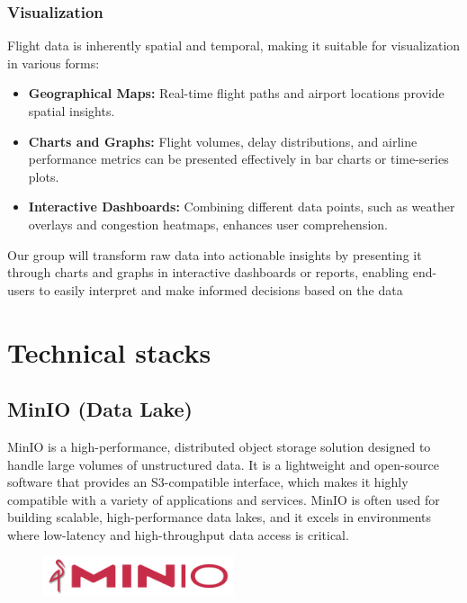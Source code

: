 \documentclass[12pt,a4paper]{article}
\begin{document}
\subsubsection{Visualization}
Flight data is inherently spatial and temporal, making it suitable for
visualization in various forms:
\begin{itemize}
    \item \textbf{Geographical Maps:} Real-time flight paths and airport
    locations provide spatial insights.
    \item \textbf{Charts and Graphs:} Flight volumes, delay distributions, and
    airline performance metrics can be presented effectively in bar charts or
    time-series plots.
    \item \textbf{Interactive Dashboards:} Combining different data points, such
    as weather overlays and congestion heatmaps, enhances user comprehension.
\end{itemize}
Our group will transform raw data into actionable insights by presenting it
through charts and graphs in interactive dashboards or reports, enabling
end-users to easily interpret and make informed decisions based on the data

\section{Technical stacks}
\subsection{MinIO (Data Lake)}
MinIO is a high-performance, distributed object storage solution designed to
handle large volumes of unstructured data. It is a lightweight and open-source
software that provides an S3-compatible interface, which makes it highly
compatible with a variety of applications and services. MinIO is often used for
building scalable, high-performance data lakes, and it excels in environments
where low-latency and high-throughput data access is critical.
\begin{figure}[h!]
    \begin{center}
        \includegraphics[width=0.5\textwidth]{Images/minIO.png}
    \end{center}
\end{figure}
\end{document}
